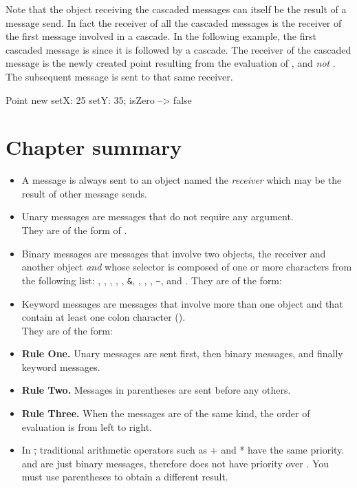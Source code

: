 \documentclass[a4paper,10pt,twoside]{book}
\begin{document}
Note that the object receiving the cascaded messages can itself be the result of a message send. 
In fact the receiver of all the cascaded messages is the receiver of the first message involved in a cascade. In the following example, the first cascaded message is  since it is followed by a cascade. The receiver of the cascaded message  is the newly created point resulting from the evaluation of , and \emph{not} . The subsequent message  is sent to that same receiver. 

\begin{code}{}
Point new setX: 25 setY: 35; isZero --> false
\end{code}

\section{Chapter summary}

\begin{itemize}
\item A message is always sent to an object named the \emph{receiver} which may be the result of other message sends.

\item Unary messages are messages that do not require any argument.\\
They are of the form of .

\item Binary messages are messages that involve two objects, the receiver and another object \emph{and} whose selector is composed of  one or more characters from the following list: \ct{+}, \ct{-}, \ct{*}, \ct{/}, \ct{|}, \texttt{\&}, \ct{=}, \ct{>}, \ct{<}, \texttt{\~}, and .
They are of the form: 
\item Keyword messages are messages that involve more than one object and that contain at least one colon character (\ct{:}). \\
They are of the form:

\item \textbf{Rule One.} Unary messages are sent first, then binary messages, and finally keyword messages.
\item \textbf{Rule Two.} Messages in parentheses are sent before any others.
\item \textbf{Rule Three.} When the messages are of the same kind, the order of evaluation is from left to right.
\item In \st, traditional arithmetic operators such as + and * have the same priority. \ct{+} and \ct{*} are just binary messages, therefore \ct{*} does not have priority over \ct{+}. You must use parentheses to obtain a different result.
\end{itemize}

\ifx\wholebook\relax\else
\end{document}

